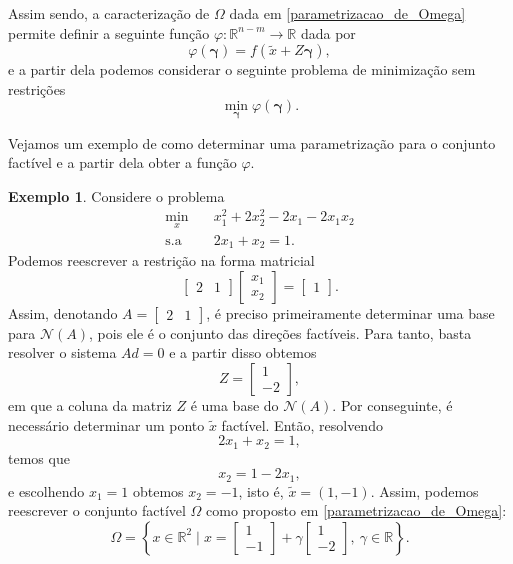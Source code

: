 \documentclass[12pt,a4paper]{scrartcl}
\def\RR{\mathds{R}}
\theoremstyle{definition}%
\newtheorem{exem}{Exemplo}
\begin{document}
Assim sendo, a caracterização de $\Omega$ dada em \eqref{parametrizacao_de_Omega} permite definir a seguinte função $\varphi : \RR^{n-m} \rightarrow \RR$ dada por
\[ \label{funcao_phi_restricoes_igualdade}
\varphi (\boldsymbol{\gamma}) = f(\tilde{x} + Z\boldsymbol{\gamma}),
\]
e a partir dela podemos considerar o seguinte problema de minimização sem restrições
\[ \label{problema_minimizacao_irrestrita_phi}
\min_{\boldsymbol{\gamma}} \varphi (\boldsymbol{\gamma}) .
\]

Vejamos um exemplo de como determinar uma parametrização para o conjunto factível e a partir dela obter a função $\varphi$.

\begin{exem}
Considere o problema 
\[ \label{exem:parametrizacao_omega}
\begin{aligned}
\min_{x} & \quad x_{1}^{2} + 2x_{2}^{2} - 2x_{1} - 2x_{1}x_{2} \\
\text{s.a} & \quad 2x_{1} + x_{2} = 1 .
\end{aligned}
\]
Podemos reescrever a restrição na forma matricial
\[
\begin{bmatrix*} 2 & 1 \end{bmatrix*} \begin{bmatrix*} x_{1} \\ x_{2} \end{bmatrix*} = \begin{bmatrix*} 1 \end{bmatrix*} .
\]
Assim, denotando $A= \begin{bmatrix*} 2 & 1 \end{bmatrix*}$, é preciso primeiramente determinar uma base para $\mathcal{N}(A)$, pois ele é o conjunto das direções factíveis. Para tanto, basta resolver o sistema $Ad =0$ e a partir disso obtemos 
\[ \label{eq:1_exem_parametrizacao_omega}
Z = \begin{bmatrix*} 1 \\ -2 \end{bmatrix*} ,
\]
em que a coluna da matriz $Z$ é uma base do $\mathcal{N}(A)$. Por conseguinte, é necessário determinar um ponto $\tilde{x}$ factível. Então, resolvendo
\[
2x_{1} + x_{2} = 1 ,
\]
temos que 
\[
x_{2} = 1 - 2x_{1} ,
\]
e escolhendo $x_{1} =1$ obtemos $x_{2} = -1$, isto é, $\tilde{x} = (1,-1)$. Assim, podemos reescrever o conjunto factível $\Omega$ como proposto em \eqref{parametrizacao_de_Omega}:
\[
\Omega = \left\{ x\in \RR^{2} \mid x = \begin{bmatrix*} 1 \\ -1 \end{bmatrix*} + \gamma \begin{bmatrix*} 1 \\ -2 \end{bmatrix*} , \ \gamma \in \RR \right\} .
\]
\end{exem}
\end{document}

